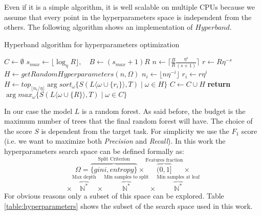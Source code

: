 \documentclass[11pt, a4paper]{article}
\begin{document}
  Even if it is a simple algorithm, it is well scalable on multiple CPUs because we assume that every point in the hyperparameters space is independent from the others. The following algorithm shows an implementation of $Hyperband$.
  
  \begin{algorithm}
    \caption{Hyperband algorithm for hyperparameters optimization}
    \label{algorithm:hyperband}
    \begin{algorithmic}[1]
        \State $C \gets \emptyset$
        \State $s_{max} \gets \lfloor \log_{\eta}{R} \rfloor, \quad B \gets (s_{max} + 1)R$
          \State $n \gets \lceil \frac{B}{R}\frac{\eta^{s}}{(s+1)} \rceil$
          \State $r \gets R\eta^{-s}$
          \State $H \gets getRandomHyperparameters(n,\Omega)$
            \State $n_{i} \gets \lfloor n\eta^{-i} \rfloor$
            \State $r_{i} \gets r\eta^{i}$
            \State $H \gets top_{\lfloor n_{i}/\eta \rfloor} \arg sort_{\omega} \{S(L\langle\omega \cup \{r_{i}\}\rangle, T) \mid \omega \in H\}$
          \EndFor
          \State $C \gets C \cup H$
        \EndFor
        \State \textbf{return} $\arg max_{\omega} \{S(L\langle\omega \cup \{R\}\rangle, T) \mid \omega \in C\}$
      \EndProcedure
    \end{algorithmic}
  \end{algorithm}

  In our case the model $L$ is a random forest. As said before, the budget is the maximum number of trees that the final random forest will have. The choice of the score $S$ is dependent from the target task. For simplicity we use the $F_{1}$ score (i.e. we want to maximize both \textit{Precision} and \textit{Recall}). In this work the hyperparameters search space can be defined formally as:
  \[\Omega = \overbrace{\{gini, entropy\}}^{\text{Split Criterion}} \times \overbrace{(0, 1]}^{\text{Features fraction}} \times\]
  \[\times \overbrace{\mathbb{N}^{*}}^{\text{Max depth}} \times \overbrace{\mathbb{N}^{*}}^{\text{Min samples to split}} \times \overbrace{\mathbb{N}^{*}}^{\text{Min samples at leaf}}\]
  For obvious reasons only a subset of this space can be explored. Table \ref{table:hyperparameters} shows the subset of the search space used in this work.
\end{document}
